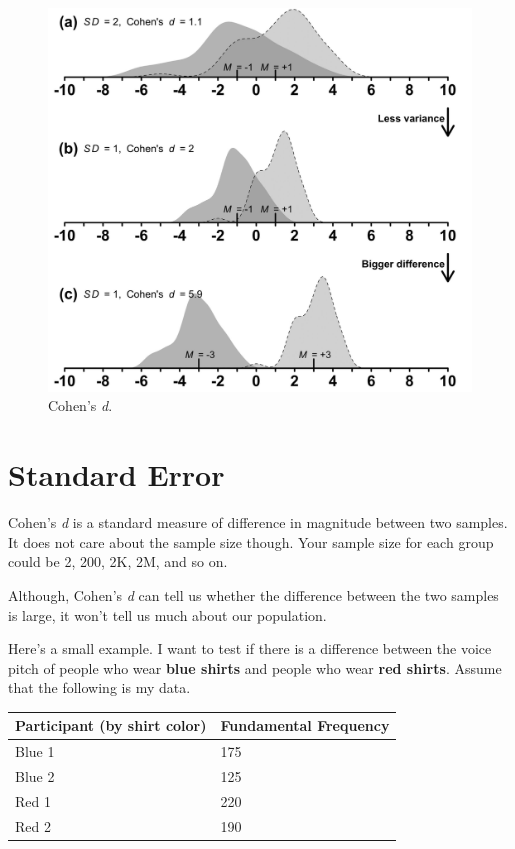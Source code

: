\documentclass[
]{book}
\begin{document}
\begin{figure}
\centering
\includegraphics{./img/cohens.png}
\caption{\label{fig:cohens}Cohen's \emph{d}.}
\end{figure}

\hypertarget{standard-error}{%
\section{Standard Error}\label{standard-error}}

Cohen's \emph{d} is a standard measure of difference in magnitude between two samples. It does not care about the sample size though. Your sample size for each group could be 2, 200, 2K, 2M, and so on.

Although, Cohen's \emph{d} can tell us whether the difference between the two samples is large, it won't tell us much about our population.

Here's a small example. I want to test if there is a difference between the voice pitch of people who wear \textbf{blue shirts} and people who wear \textbf{red shirts}. Assume that the following is my data.

\begin{longtable}[]{@{}ll@{}}
\toprule\noalign{}
\textbf{Participant (by shirt color) } & \textbf{Fundamental Frequency} \\
\midrule\noalign{}
\endhead
\bottomrule\noalign{}
\endlastfoot
Blue 1 & 175 \\
Blue 2 & 125 \\
Red 1 & 220 \\
Red 2 & 190 \\
\end{longtable}
\end{document}
